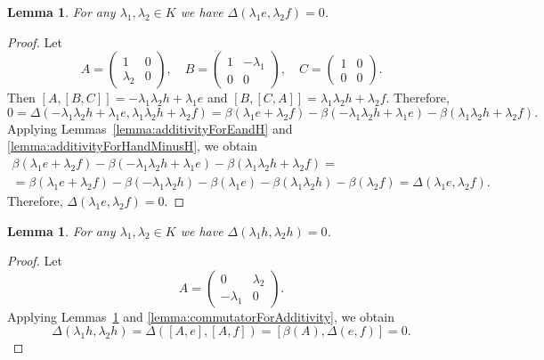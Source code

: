\documentclass[a4paper,reqno,12pt]{amsart}
\newtheorem{lemma}[proposition]{Lemma}
\theoremstyle{definition}
\theoremstyle{remark}
\begin{document}
	\begin{lemma}\label{lemma:additivityForEandF}
		For any $\lambda_1, \lambda_2 \in K$ we have $\Delta(\lambda_1 e, \lambda_2 f) = 0$.
	\end{lemma}

	\begin{proof}
		Let
		\begin{equation*}
			A = 
			\begin{pmatrix}
				1 & 0 \\
				\lambda_2 & 0
			\end{pmatrix}, \quad
			B = 
			\begin{pmatrix}
				1 & -\lambda_1 \\
				0 & 0
			\end{pmatrix}, \quad
			C = 
			\begin{pmatrix}
				1 & 0 \\
				0 & 0
			\end{pmatrix}.
		\end{equation*}
		Then $[A, [B, C]] = -\lambda_1 \lambda_2 h + \lambda_1 e$ and $[B, [C, A]] = \lambda_1\lambda_2 h + \lambda_2 f$. Therefore,
		\begin{equation*}
			0 = \Delta(-\lambda_1 \lambda_2 h + \lambda_1 e, \lambda_1\lambda_2 h + \lambda_2 f) = \beta(\lambda_1 e + \lambda_2 f) - \beta(-\lambda_1 \lambda_2 h + \lambda_1 e) - \beta(\lambda_1\lambda_2 h + \lambda_2 f).
		\end{equation*}
		Applying Lemmas~\ref{lemma:additivityForEandH} and \ref{lemma:additivityForHandMinusH}, we obtain
		\begin{multline*}
			\beta(\lambda_1 e + \lambda_2 f) - \beta(-\lambda_1\lambda_2 h + \lambda_1 e) - \beta(\lambda_1\lambda_2 h + \lambda_2 f) = \\ = \beta(\lambda_1 e + \lambda_2 f) - \beta(-\lambda_1\lambda_2 h) - \beta(\lambda_1 e) - \beta(\lambda_1\lambda_2 h) - \beta(\lambda_2 f) = \Delta(\lambda_1 e, \lambda_2 f).
		\end{multline*}
		Therefore, $\Delta(\lambda_1 e, \lambda_2 f) = 0$.
	\end{proof}

	\begin{lemma}\label{lemma:additivityForH}
		For any $\lambda_1, \lambda_2 \in K$ we have $\Delta(\lambda_1 h, \lambda_2 h) = 0$.
	\end{lemma}

	\begin{proof}
		Let
		\begin{equation*}
			A = 
			\begin{pmatrix}
				0 & \lambda_2 \\
				-\lambda_1 & 0
			\end{pmatrix}.
		\end{equation*}
		Applying Lemmas~\ref{lemma:additivityForEandF} and \ref{lemma:commutatorForAdditivity}, we obtain
		\begin{equation*}
			\Delta(\lambda_1 h, \lambda_2 h) = \Delta([A, e], [A, f]) = [\beta(A), \Delta(e, f)] = 0.
		\end{equation*}
	\end{proof}
\end{document}
